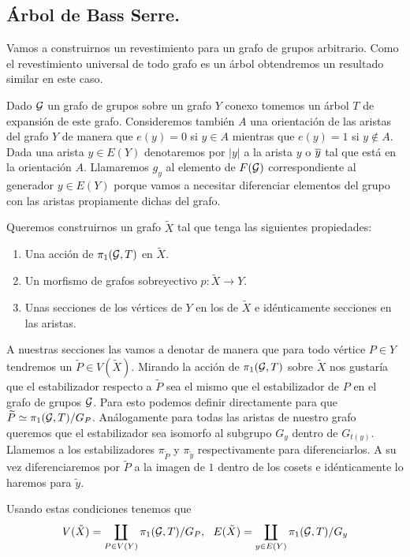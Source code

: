 \documentclass[tesis.tex]{subfiles}
\newcommand{\cG}{ {\cal G} }
\newcommand{\Xm}{\widetilde X}
\begin{document}
\subsection{Árbol de Bass Serre.}
Vamos a construirnos un revestimiento para un grafo de grupos arbitrario. 
Como el revestimiento universal de todo grafo es un árbol obtendremos un resultado similar en este caso.

Dado $\cG$ un grafo de grupos sobre un grafo $Y$ conexo tomemos un árbol $T$ de expansión de este grafo.
Consideremos también $A$ una orientación de las aristas del grafo $Y$ de manera que $e(y)=0$ si $y \in A$ mientras que $e(y)=1$ si $y \notin A$.
Dada una arista $y \in E(Y)$ denotaremos por $|y|$ a la arista $y$ o $\overline{y}$ tal que está en la orientación $A$.
Llamaremos $g_y$ al elemento de $F(\cG)$ correspondiente al generador $y \in E(Y)$ porque vamos a necesitar diferenciar elementos del grupo con las aristas propiamente dichas del grafo.

Queremos construirnos un grafo $\Xm$ tal que tenga las siguientes propiedades:

\begin{enumerate}
	\item Una acción de $\pi_1(\cG, T)$ en $\Xm$.
	\item Un morfismo de grafos sobreyectivo $p:\Xm \to Y$. 
	\item Unas secciones de los vértices de $Y$ en los de $\Xm$ e idénticamente secciones en las aristas.
\end{enumerate}

A nuestras secciones las vamos a denotar de manera que para todo vértice $P \in Y$ tendremos un $ \widetilde P \in V(\Xm)$.
Mirando la acción de $\pi_1(\cG, T)$ sobre $\Xm$ nos gustaría que el estabilizador respecto a $\widetilde P$ sea el mismo que el estabilizador de $P$ en el grafo de grupos $\cG$. 
Para esto podemos definir directamente para que $\widetilde P \simeq \pi_1(\cG, T) / G_P$.
Análogamente para todas las aristas de nuestro grafo queremos que el estabilizador sea isomorfo al subgrupo $G_y$ dentro de $G_{t(y)}$.
Llamemos a los estabilizadores $\pi_{\widetilde P}$ y $\pi_{\widetilde y} $ respectivamente para diferenciarlos. 
A su vez diferenciaremos por $\widetilde P$ a la imagen de $1$ dentro de los cosets e idénticamente lo haremos para $\widetilde y$. 

Usando estas condiciones tenemos que
\begin{equation*}
	V(\tilde X) = \coprod_{P \in V(Y)} \pi_1(\cG, T) / G_P, \ \  E(\tilde X) = \coprod_{y \in E(Y)} \pi_1(\cG, T) / G_y
\end{equation*}
\end{document}
